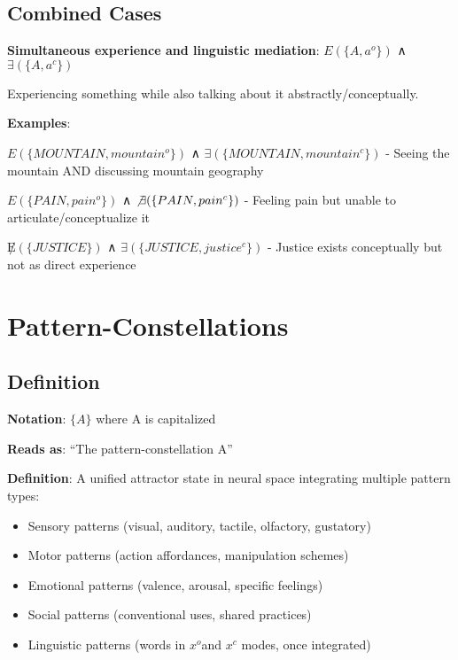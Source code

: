 \documentclass[12pt]{article}
\providecommand{\tightlist}{}   %
\begin{document}
\subsection{Combined Cases}\label{combined-cases}

\textbf{Simultaneous experience and linguistic mediation}: \(E(\{A, a^o\})\) ∧ \(\exists(\{A, a^c\})\)

Experiencing something while also talking about it abstractly/conceptually.

\textbf{Examples}:

\(E(\{MOUNTAIN, mountain^o\})\) ∧ \(\exists(\{MOUNTAIN, mountain^c\})\) - Seeing the mountain AND discussing mountain geography

\(E(\{PAIN, pain^o\})\) ∧ \(\not\exists(\{PAIN, pain^c\})\) - Feeling pain but unable to articulate/conceptualize it

\(\not E(\{JUSTICE\})\) ∧ \(\exists(\{JUSTICE, justice^c\})\) - Justice exists conceptually but not as direct experience

\section{Pattern-Constellations}\label{pattern-constellations}

\subsection{Definition}\label{definition}

\textbf{Notation}: \(\{A\}\) where A is capitalized

\textbf{Reads as}: ``The pattern-constellation A''

\textbf{Definition}: A unified attractor state in neural space integrating multiple pattern types:

\begin{itemize}
\tightlist
\item
  Sensory patterns (visual, auditory, tactile, olfactory, gustatory)
\item
  Motor patterns (action affordances, manipulation schemes)
\item
  Emotional patterns (valence, arousal, specific feelings)
\item
  Social patterns (conventional uses, shared practices)
\item
  Linguistic patterns (words in \(x^o\)and \(x^c\) modes, once integrated)
\end{itemize}
\end{document}

